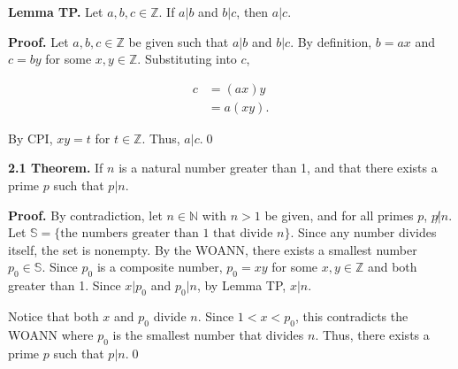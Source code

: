 \documentclass[12pt]{article}
\begin{document}
\noindent\textbf{Lemma TP.} Let $a,b,c\in\mathbb{Z}$. If $a|b$ and $b|c$, then $a|c$.

\bigskip

\noindent\textbf{Proof.} Let $a,b,c\in\mathbb{Z}$ be given such that $a|b$ and $b|c$. By definition, $b=ax$ and $c=by$ for some $x,y\in\mathbb{Z}$. Substituting into $c$,

\begin{align*}
c &= (ax)y \\
&= a(xy).
\end{align*}

\noindent By CPI, $xy=t$ for $t\in\mathbb{Z}$. Thus, $a|c$.\qed

\bigskip

\noindent\textbf{2.1 Theorem.} If $n$ is a natural number greater than 1, and that there exists a prime $p$ such that $p|n$.

\bigskip

\noindent\textbf{Proof.} By contradiction, let $n\in\mathbb{N}$ with $n>1$ be given, and for all primes $p$, $p\not|n$. Let $\mathbb{S}=\{\text{the numbers greater than 1 that divide }n\}$. Since any number divides itself, the set is nonempty. By the WOANN, there exists a smallest number $p_{0}\in\mathbb{S}$. Since $p_{0}$ is a composite number, $p_{0}=xy$ for some $x,y\in\mathbb{Z}$ and both greater than 1. Since $x|p_{0}$ and $p_{0}|n$, by Lemma TP, $x|n$.

\bigskip

\noindent Notice that both $x$ and $p_{0}$ divide $n$. Since $1<x<p_{0}$, this contradicts the WOANN where $p_{0}$ is the smallest number that divides $n$. Thus, there exists a prime $p$ such that $p|n$.\qed
\end{document}
